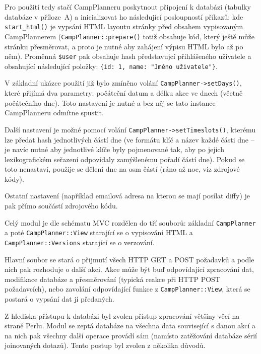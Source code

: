 Pro použití tedy stačí CampPlanneru poskytnout připojení k databázi (tabulky
databáze v příloze~A) a inicializovat ho následující posloupností příkazů:
kde \verb|start_html()| je vypsání HTML layoutu stránky před obsahem vypisovaným
CampPlannerem ({\tt CampPlanner::prepare()} totiž obsahuje kód, který ještě může
stránku přesměrovat, a proto je nutné aby zahájení výpisu HTML bylo až po něm).
Proměnná \verb|$user| pak obsahuje hash představujcí přihlášeného uživatele
a obsahující následující položky: \verb|{id: 1, name: "Jméno uživatele"}|.


V základní ukázce použití již bylo zmíněno volání \verb|CampPlanner->setDays()|,
které přijímá dva parametry: počáteční datum a délku akce ve dnech (včetně
počátečního dne). Toto nastavení je nutné a bez něj se tato instance
CampPlanneru odmítne spustit.

Další nastavení je možné pomocí volání \verb|CampPlanner->setTimeslots()|,
kterému lze předat hash jednotlivých částí dne (ve formátu klíč a název každé
části dne -- je navíc nutné aby jednotlivé klíče byly pojmenované tak, aby po
jejich lexikografickém seřazení odpovídaly zamýšlenému pořadí částí dne). Pokud
se toto nenastaví, použije se dělení dne na osm částí (ráno až noc, viz zdrojové
kódy).

Ostatní nastavení (například emailová adresa na kterou se mají posílat diffy) je
pak přímo součástí zdrojového kódu.

\eject
{}

Celý modul je dle schématu MVC rozdělen do tří souborů: základní {\tt CampPlanner}
a poté {\tt CampPlanner::View} starající se o vypisování HTML
a {\tt CampPlanner::Versions} starající se o verzování.

Hlavní soubor se stará o přijmutí všech HTTP GET a POST požadavků a podle nich
pak rozhoduje o další akci. Akce může být buď odpovídající zpracování dat,
modifikace databáze a přesměrování (typická reakce při HTTP POST požadavcích),
nebo zavolání odpovídající funkce z {\tt CampPlanner::View}, která se postará
o vypsání dat jí předaných.

Z hlediska přístupu k databázi byl zvolen přístup zpracování většiny věcí na
straně Perlu. Modul se zeptá databáze na všechna data související s danou akcí
a na nich pak všechny další operace provádí sám (namísto zatěžování databáze
sérií joinovaných dotazů). Tento postup byl zvolen z několika důvodů.


